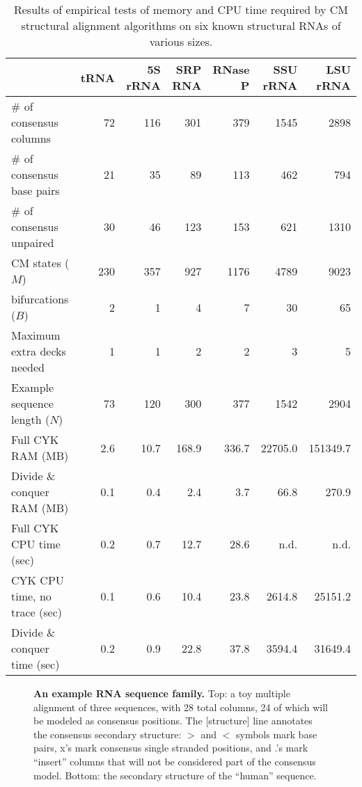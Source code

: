 \documentclass[11pt]{article}
\newif\ifdraft
\begin{document}
\newpage


\ifdraft
 \relax
\else
\newpage
\begin{table}[h]
\begin{tabular}{lrrrrrr} 
                             & tRNA&5S rRNA& SRP RNA&RNase P& SSU rRNA& LSU rRNA \\\hline
\# of consensus columns      &  72 &  116 &   301 &   379 &   1545 &    2898\\ 
\# of consensus base pairs   &  21 &   35 &    89 &   113 &    462 &     794\\ 
\# of consensus unpaired     &  30 &   46 &   123 &   153 &    621 &    1310\\ 
CM states ($M$)              & 230 &  357 &   927 &  1176 &   4789 &    9023\\ 
bifurcations ($B$)           &   2 &    1 &     4 &     7 &     30 &      65\\ 
Maximum extra decks needed   &   1 &    1 &     2 &     2 &      3 &       5\\ 
Example sequence length ($N$)&  73 &  120 &   300 &   377 &   1542 &    2904\\
Full CYK RAM (MB)            & 2.6 & 10.7 & 168.9 & 336.7 &22705.0 &151349.7\\
Divide \& conquer RAM (MB)   & 0.1 &  0.4 &   2.4 &   3.7 &   66.8 &   270.9\\ 
Full CYK CPU time (sec)      & 0.2 &  0.7 &  12.7 &  28.6 &   n.d. &    n.d.\\ 
CYK CPU time, no trace (sec) & 0.1 &  0.6 &  10.4 &  23.8 & 2614.8 & 25151.2\\
Divide \& conquer time (sec) & 0.2 &  0.9 &  22.8 &  37.8 & 3594.4 & 31649.4\\\hline
\end{tabular}
\caption{Results of empirical tests of memory and CPU time required by
CM structural alignment algorithms on six known structural RNAs of
various sizes.}
\label{tbl:results}
\end{table}

\newpage
\begin{figure}[h]
\caption{\textbf{An example RNA sequence family.} Top: a toy multiple
alignment of three sequences, with 28 total columns, 24 of which will
be modeled as consensus positions. The [structure] line annotates the
consensus secondary structure: $>$ and $<$ symbols mark base pairs,
x's mark consensus single stranded positions, and .'s mark
``insert'' columns that will not be considered part of the consensus
model. Bottom: the secondary structure of the ``human'' sequence.} 
\label{fig:input_alignment}
\end{figure}
\end{document}
